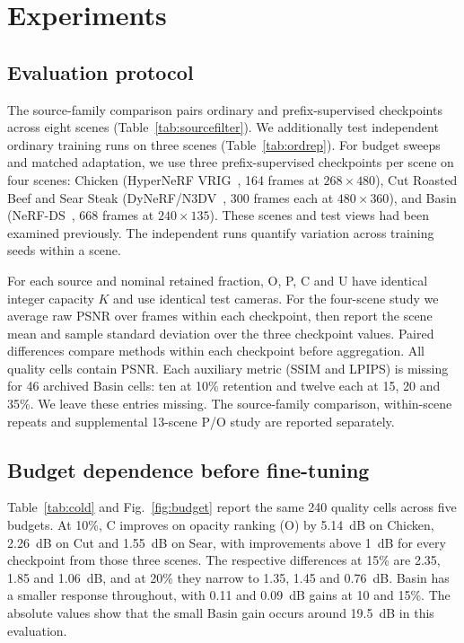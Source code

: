 \section{Experiments}
\label{sec:experiments}

\subsection{Evaluation protocol}
\label{sec:setup}
The source-family comparison pairs ordinary and prefix-supervised checkpoints across eight scenes (Table~\ref{tab:sourcefilter}). We additionally test independent ordinary training runs on three scenes (Table~\ref{tab:ordrep}). For budget sweeps and matched adaptation, we use three prefix-supervised checkpoints per scene on four scenes: Chicken (HyperNeRF VRIG~\cite{park2021hypernerf}, 164 frames at $268\times480$), Cut Roasted Beef and Sear Steak (DyNeRF/N3DV~\cite{li2022neuralvideo}, 300 frames each at $480\times360$), and Basin (NeRF-DS~\cite{yan2023nerf}, 668 frames at $240\times135$). These scenes and test views had been examined previously. The independent runs quantify variation across training seeds within a scene.

For each source and nominal retained fraction, O, P, C and U have identical integer capacity $K$ and use identical test cameras. For the four-scene study we average raw PSNR over frames within each checkpoint, then report the scene mean and sample standard deviation over the three checkpoint values. Paired differences compare methods within each checkpoint before aggregation. All quality cells contain PSNR. Each auxiliary metric (SSIM and LPIPS) is missing for 46 archived Basin cells: ten at 10\% retention and twelve each at 15, 20 and 35\%. We leave these entries missing. The source-family comparison, within-scene repeats and supplemental 13-scene P/O study are reported separately.


\subsection{Budget dependence before fine-tuning}
\label{sec:cold}
Table~\ref{tab:cold} and Fig.~\ref{fig:budget} report the same 240 quality cells across five budgets. At 10\%, C improves on opacity ranking (O) by 5.14~dB on Chicken, 2.26~dB on Cut and 1.55~dB on Sear, with improvements above 1~dB for every checkpoint from those three scenes. The respective differences at 15\% are 2.35, 1.85 and 1.06~dB, and at 20\% they narrow to 1.35, 1.45 and 0.76~dB. Basin has a smaller response throughout, with 0.11 and 0.09~dB gains at 10 and 15\%. The absolute values show that the small Basin gain occurs around 19.5~dB in this evaluation.

